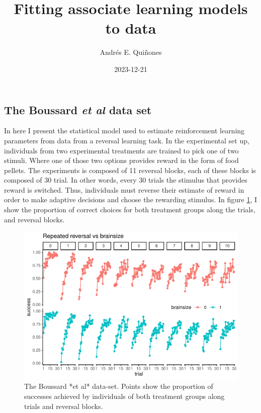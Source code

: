 \documentclass[
]{article}
\title{Fitting associate learning models to data}
\author{Andrés E. Quiñones}
\date{2023-12-21}
\begin{document}
\maketitle

\hypertarget{the-boussard-et-al-data-set}{%
\subsection{\texorpdfstring{The Boussard \emph{et al} data
set}{The Boussard et al data set}}\label{the-boussard-et-al-data-set}}

In here I present the statistical model used to estimate reinforcement
learning parameters from data from a reversal learning task. In the
experimental set up, individuals from two experimental treatments are
trained to pick one of two stimuli. Where one of those two options
provides reward in the form of food pellets. The experiments is composed
of 11 reversal blocks, each of these blocks is composed of 30 trial. In
other words, every 30 trials the stimulus that provides reward is
switched. Thus, individuals must reverse their estimate of reward in
order to make adaptive decisions and choose the rewarding stimulus. In
figure \ref{fig:plotBoussard}, I show the proportion of correct choices
for both treatment groups along the trials, and reversal blocks.

\begin{figure}

\includegraphics{report_files/figure-latex/plotBoussard-1} \hfill{}

\caption{The Boussard *et al* data-set. Points show the proportion of successes achieved by individuals of both treatment groups along trials and reversal blocks.}\label{fig:plotBoussard}
\end{figure}
\end{document}
